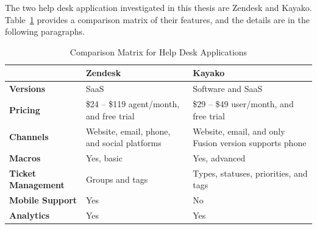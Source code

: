 The two help desk application investigated in this thesis are Zendesk and Kayako. Table~\ref{tab:comp_matr_help} provides a comparison matrix of their features, and the details are in the following paragraphs.

\begin{table}[!ht]
\begin{center}
	\caption[Comparison Matrix for Help Desk Applications]{Comparison Matrix for Help Desk Applications} \label{tab:comp_matr_help}
    \begin{tabular}{ | p{3cm} | p{5cm} | p{5cm} | }
	\hline
	& \textbf{Zendesk} & \textbf{Kayako} \\ \hline
	\textbf{Versions} & SaaS & Software and SaaS \\ \hline
	\textbf{Pricing} & \$24 -- \$119 agent/month, and free trial & \$29 -- \$49 user/month, and free trial \\ \hline
	\textbf{Channels} & Website, email, phone, and social platforms & Website, email, and only Fusion version supports phone \\ \hline
	\textbf{Macros} & Yes, basic & Yes, advanced \\ \hline
	\textbf{Ticket Management} & Groups and tags & Types, statuses, priorities, and tags \\ \hline
	\textbf{Mobile Support} & Yes & No \\ \hline
	\textbf{Analytics} & Yes & Yes \\ \hline
    \end{tabular}
\end{center}
\end{table}

